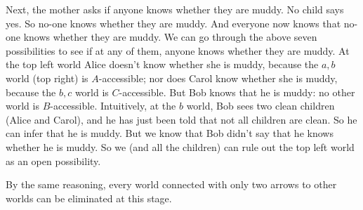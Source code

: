 Next, the mother asks if anyone knows whether they are muddy. No child says yes.
So no-one knows whether they are muddy. And everyone now knows that no-one knows
whether they are muddy. We can go through the above seven possibilities to see
if at any of them, anyone knows whether they are muddy. At the top left world
Alice doesn't know whether she is muddy, because the $a,b$
world (top right) is $A$-accessible; nor does Carol know whether she is muddy,
because the $b,c$ world is $C$-accessible. But Bob knows that he is muddy: no other
world is $B$-accessible. Intuitively, at the $b$ world, Bob sees two
clean children (Alice and Carol), and he has just been told that not all
children are clean. So he can infer that he is muddy. But we know that Bob
didn't say that he knows whether he is muddy. So we (and all the children) can
rule out the top left world as an open possibility.

By the same reasoning, every world connected with only two arrows to other
worlds can be eliminated at this stage.

\begin{center}
\end{center}

